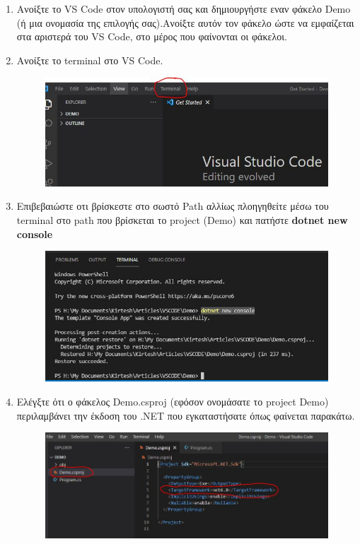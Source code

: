 \begin{enumerate}
    \item Ανοίξτε το VS Code στον υπολογιστή σας και δημιουργήστε εναν φάκελο Demo (ή μια ονομασία της επιλογής σας).Ανοίξτε αυτόν τον φάκελο ώστε να εμφαίζεται στα αριστερά του VS Code, στο μέρος που φαίνονται οι φάκελοι.
    \\[8\baselineskip]

    \item Ανοίξτε το terminal στο VS Code.
    \begin{figure}[ht]
        \centering
        \includegraphics[scale=0.4]{images/instVSC5.jpeg}
    \end{figure}

    \item Επιβεβαιώστε οτι βρίσκεστε στο σωστό Path αλλίως πλοηγηθείτε μέσω του terminal στο path που βρίσκεται το project (Demo) και πατήστε \textbf{dotnet new console}

    \begin{figure}[ht]
        \centering
        \includegraphics[scale=0.4]{images/instVSC6.jpeg}
    \end{figure}

    \item Ελέγξτε ότι ο φάκελος Demo.csproj (εφόσον ονομάσατε το project Demo) περιλαμβάνει την έκδοση του .ΝΕΤ που εγκαταστήσατε όπως φαίνεται παρακάτω.

    \begin{figure}[ht]
        \centering
        \includegraphics[scale=0.5]{images/instVSC7.jpeg}
    \end{figure}


\end{enumerate}
